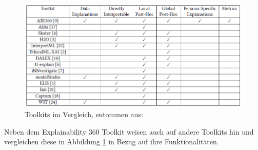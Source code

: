 \begin{figure}[h]
    \centering
    \includegraphics[scale=0.6]{pic/MA-Bilder/Literaturrecherche/30-Toolkits.PNG}
    \caption{Toolkits im Vergleich, entommen aus: \cite{arya2021ai}}
    \label{Fig:toolkitsvergleich}
\end{figure}

Neben dem Explainability 360 Toolkit weisen \cite{arya2021ai} auch auf andere Toolkits hin und vergleichen diese in Abbildung \ref{Fig:toolkitsvergleich} in Bezug auf ihre Funktionalitäten.